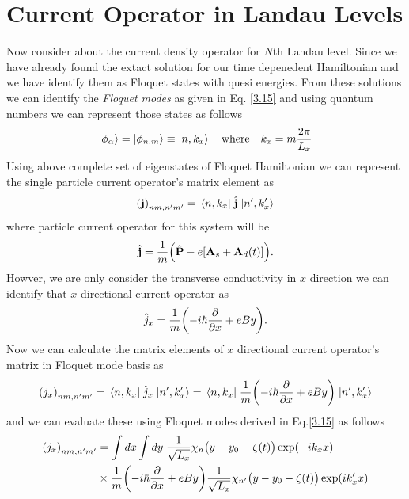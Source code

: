 \section{Current Operator in Landau Levels}

Now consider about the current density operator for $N$th Landau level. Since we have already found the extact solution for our time depenedent Hamiltonian and we have identify them as Floquet states with quesi energies. From these solutions we can identify the \textit{Floquet modes} as given in Eq. \eqref{3.15} and using quantum numbers we can represent those states as follows
\begin{equation} \label{6.1}
  \ket{\phi_{\alpha}} = \ket{\phi_{n,m}} \equiv \ket{n,k_x} \quad
  \text{where} \quad
  k_x = m \frac{2\pi}{L_x}
\end{equation}
Using above complete set of eigenstates of Floquet Hamiltonian we can represent the single particle current operator's matrix element as
\begin{equation} \label{6.2}
  \qty(\mathbf{j})_{nm,n'm'} = \mel{n,k_x}{\;\hat{\mathbf{j}}\;}{n',k'_x}
\end{equation}
where particle current operator for this system will be
\begin{equation} \label{6.3}
  \hat{\mathbf{j}} = \frac{1}{m} \qty(\hat{\mathbf{P}} - e\qty[\mathbf{A}_s + \mathbf{A}_d(t)]).
\end{equation}
Howver, we are only consider the transverse conductivity in $x$ direction we can identify that $x$ directional current operator as
\begin{equation} \label{6.4}
  \hat{j}_x = \frac{1}{m} \qty(-i\hbar\pdv{x} + eBy).
\end{equation}
Now we can calculate the matrix elements of $x$ directional current operator's matrix in Floquet mode basis as
\begin{equation} \label{6.5}
  \qty({j}_x)_{nm,n'm'} = \mel{n,k_x}{\;\hat{j}_x\;}{n',k'_x} =
  \mel{n,k_x}{\;\frac{1}{m} \qty(-i\hbar\pdv{x} + eBy)\;}{n',k'_x}
\end{equation}
and we can evaluate these using Floquet modes derived in Eq.\eqref{3.15} as follows
\begin{equation} \label{6.6}
  \begin{aligned}
    \qty({j}_x)_{nm,n'm'} & =
    \int dx \int dy \;
    \frac{1}{\sqrt{L_x}} \chi_{n}\big(y - y_0 - \zeta(t)\big)
    \exp(-ik_x x) \\
    & \times
    \frac{1}{m} \qty(-i\hbar\pdv{x} + eBy)
    \frac{1}{\sqrt{L_x}} \chi_{n'}\big(y - y_0 - \zeta(t)\big)
    \exp(i k'_x x)
  \end{aligned}
\end{equation}
